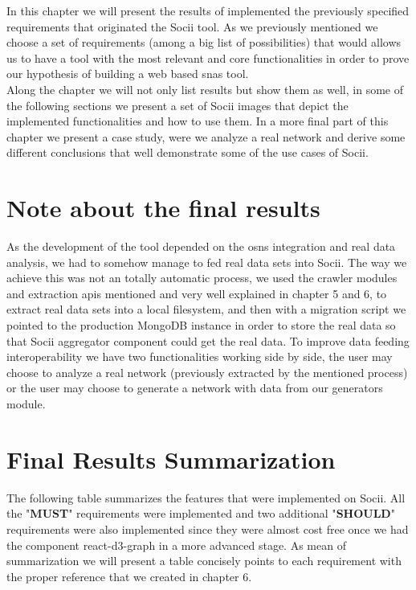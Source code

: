 In this chapter we will present the results of implemented the previously specified requirements that originated the Socii tool. As we previously mentioned we
choose a set of requirements (among a big list of possibilities) that would allows us to have a tool with the most relevant and core functionalities
in order to prove our hypothesis of building a web based \glspl{sna} tool.\\
\indent Along the chapter we will not only list results but show them as well, in some of the following sections we present a set of Socii images that depict the implemented functionalities and how to use them. In a more final part of this chapter we present a case study, were we analyze a real network and derive some different conclusions that well demonstrate some of the use cases of Socii.

\section{Note about the final results}

As the development of the tool depended on the \glspl{osn} integration and real data analysis, we had to somehow manage to fed real data sets into
Socii. The way we achieve this was not an totally automatic process, we used the crawler modules and extraction \glspl{api} mentioned and very well explained in chapter 5 and 6, to extract real data sets into a local filesystem, and then with a migration script we pointed to the production MongoDB instance in order to store the real data so that Socii aggregator component could get the real data. To improve data feeding interoperability we have two functionalities working side by side, the user may choose to analyze a real network (previously extracted by the mentioned process) or the user may choose to generate a network with data from our generators module.


\section{Final Results Summarization}

The following table summarizes the features that were implemented on Socii. All the "\textbf{MUST}" requirements were implemented
and two additional "\textbf{SHOULD}" requirements were also implemented since they were almost cost free once we had the
component react-d3-graph in a more advanced stage. As mean of summarization we will present a table concisely points to
each requirement with the proper reference that we created in chapter 6.

